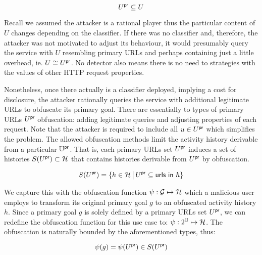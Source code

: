 \begin{equation}
U^{\mathsf{pr}} \subseteq U
\end{equation}

Recall we assumed the attacker is a rational player thus the particular content of $U$ changes depending on the classifier. If there was no classifier and, therefore, the attacker was not motivated to adjust its behaviour, it would presumably query the service with $U$
resembling primary URLs and perhaps containing just a little
overhead, ie. $U \cong U^{\mathsf{pr}}$. No detector also means there is no need to strategies with the values of other HTTP request properties.

Nonetheless, once there actually is a classifier deployed, implying a
cost for disclosure, the attacker rationally queries the service with additional legitimate URLs to obfuscate its primary goal. There are essentially to types of primary URLs $U^{\mathsf{pr}}$ obfuscation: adding legitimate queries and adjusting properties of each request. Note that the attacker is required to include all $u \in U^{\mathsf{pr}}$ which simplifies the problem. The allowed obfuscation methods limit the activity history derivable from a particular $\mathbb{U}^{\mathsf{pr}}$. That is, each primary URLs set $U^{\mathsf{pr}}$ induces a set of histories $S(U^{\mathsf{pr}}) \subset \mathcal{H}$ that contains histories derivable from
$U^{\mathsf{pr}}$ by obfuscation.

\begin{equation}\label{eq:derivable_histories}
S(U^{\mathsf{pr}}) = \{ h \in \mathcal{H} \,\big|\, U^{\mathsf{pr}} \subseteq \textsf{urls in }h \}
\end{equation}

We capture this with the obfuscation function $\psi: \mathcal{G} \mapsto \mathcal{H} $ which a malicious user employs to transform its original primary goal $g$ to an
obfuscated activity history $h$. Since a primary goal $g$ is solely defined by a primary URLs set $U^{\mathsf{pr}}$, we can redefine the obfuscation function for this use case to: $\psi: 2^{\mathbb{U}} \mapsto \mathcal{H}$. The obfuscation is naturally bounded by the aforementioned types, thus:

\begin{equation}
    \psi(g) = \psi(U^{\mathsf{pr}}) \in S( U^{\mathsf{pr}} )
\end{equation}

